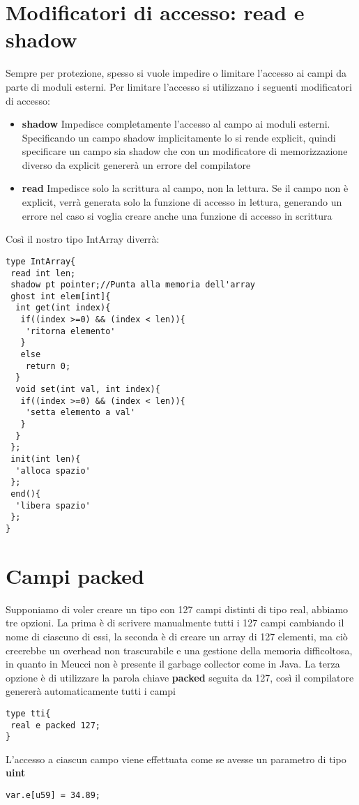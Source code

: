 \documentclass[10pt]{book}%
\newcommand{\e}{\`{e} }
\newcommand{\ac}[1]{\`{#1}}
\renewcommand{\emph}[1]{\textbf{#1}}
\newenvironment{codeenv}{
\begin{mdframed}[backgroundcolor=black!20,topline=false,leftline=false,rightline=false,bottomline=false]
}
{\end{mdframed}}
\begin{document}
\section{Modificatori di accesso: read e shadow}
Sempre per protezione, spesso si vuole impedire o limitare l'accesso ai campi da parte di moduli esterni. Per limitare l'accesso si utilizzano i seguenti modificatori di accesso:
\begin{itemize}
\item \emph{shadow} Impedisce completamente l'accesso al campo ai moduli esterni. Specificando un campo shadow implicitamente lo si rende explicit, quindi specificare un campo sia shadow che con un modificatore di memorizzazione diverso da explicit generer\ac a un errore del compilatore
\item \emph{read} Impedisce solo la scrittura al campo, non la lettura. Se il campo non \e explicit, verr\ac a generata solo la funzione di accesso in lettura, generando un errore nel caso si voglia creare anche una funzione di accesso in scrittura
\end{itemize}

Cos\ac i il nostro tipo IntArray diverr\ac a:
\begin{codeenv}
\begin{verbatim}
type IntArray{
 read int len;
 shadow pt pointer;//Punta alla memoria dell'array
 ghost int elem[int]{
  int get(int index){
   if((index >=0) && (index < len)){
    'ritorna elemento'
   }
   else
    return 0;
  }
  void set(int val, int index){
   if((index >=0) && (index < len)){
    'setta elemento a val'
   }
  }
 };
 init(int len){
  'alloca spazio'
 };
 end(){
  'libera spazio'
 };
}
\end{verbatim}
\end{codeenv}

\section{Campi packed}
Supponiamo di voler creare un tipo con 127 campi distinti di tipo real, abbiamo tre opzioni. La prima \e di scrivere manualmente tutti i 127 campi cambiando il nome di ciascuno di essi, la seconda \e di creare un array di 127 elementi, ma ci\ac o creerebbe un overhead non trascurabile e una gestione della memoria difficoltosa, in quanto in Meucci non \e presente il garbage collector come in Java. La terza opzione \e di utilizzare la parola chiave \emph{packed} seguita da 127, cos\ac i il compilatore generer\ac a automaticamente tutti i campi
\begin{codeenv}
\begin{verbatim}
type tti{
 real e packed 127;
}
\end{verbatim}
\end{codeenv}
L'accesso a ciascun campo viene effettuata come se avesse un parametro di tipo \emph{uint}
\begin{codeenv}
\begin{verbatim}
var.e[u59] = 34.89;
\end{verbatim}
\end{codeenv}
\end{document}
